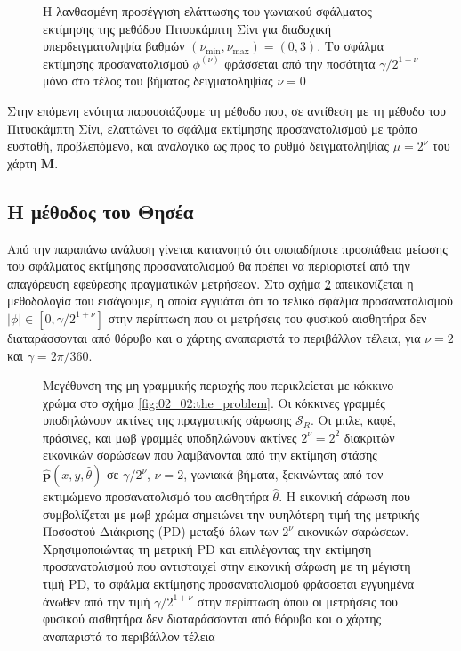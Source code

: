 \begin{figure}[!h]\centering
  
  \caption{\small Η λανθασμένη προσέγγιση ελάττωσης του γωνιακού σφάλματος
           εκτίμησης της μεθόδου Πιτυοκάμπτη Σίνι για διαδοχική
           υπερδειγματοληψία βαθμών $(\nu_{\min}, \nu_{\max}) = (0,3)$. Το
           σφάλμα εκτίμησης προσανατολισμού $\phi^{(\nu)}$ φράσσεται από την
           ποσότητα $\gamma/2^{1+\nu}$ μόνο στο τέλος του βήματος
           δειγματοληψίας $\nu=0$}
  \label{fig:02_04_02:sinis}
\end{figure}

Στην επόμενη ενότητα παρουσιάζουμε τη μέθοδο που, σε αντίθεση με τη μέθοδο του
Πιτυοκάμπτη Σίνι, ελαττώνει το σφάλμα εκτίμησης προσανατολισμού με τρόπο
ευσταθή, προβλεπόμενο, και αναλογικό ως προς το ρυθμό δειγματοληψίας $\mu =
2^{\nu}$ του χάρτη $\bm{M}$.

\subsection{Η μέθοδος του Θησέα}
\label{subsection:02_04_02:06}

Από την παραπάνω ανάλυση γίνεται κατανοητό ότι οποιαδήποτε προσπάθεια
μείωσης του σφάλματος εκτίμησης προσανατολισμού θα πρέπει να περιοριστεί από
την απαγόρευση εφεύρεσης πραγματικών μετρήσεων. Στο σχήμα
\ref{fig:oversampling_correct} απεικονίζεται η μεθοδολογία που εισάγουμε, η
οποία εγγυάται ότι το τελικό σφάλμα προσανατολισμού $|\phi| \in [0,\gamma /
2^{1+\nu}]$ στην περίπτωση που οι μετρήσεις του φυσικού αισθητήρα δεν
διαταράσσονται από θόρυβο και ο χάρτης αναπαριστά το περιβάλλον τέλεια, για
$\nu = 2$ και $\gamma = 2\pi/360$.

\begin{figure}[!h]\centering
  
  \caption{\small Μεγέθυνση της μη γραμμικής περιοχής που περικλείεται με
           κόκκινο χρώμα στο σχήμα \ref{fig:02_02:the_problem}. Οι κόκκινες
           γραμμές υποδηλώνουν ακτίνες της πραγματικής σάρωσης $\mathcal{S}_R$.
           Οι μπλε, καφέ, πράσινες, και μωβ γραμμές υποδηλώνουν
           ακτίνες $2^\nu = 2^2$ διακριτών εικονικών σαρώσεων που λαμβάνονται
           από την εκτίμηση στάσης $\hat{\bm{p}}(x,y,\hat{\theta})$ σε
           $\gamma/2^\nu$, $\nu = 2$, γωνιακά βήματα, ξεκινώντας από τον
           εκτιμώμενο προσανατολισμό του αισθητήρα $\hat{\theta}$. Η εικονική
           σάρωση που συμβολίζεται με μωβ χρώμα σημειώνει την υψηλότερη τιμή
           της μετρικής Ποσοστού Διάκρισης (PD) μεταξύ όλων των $2^\nu$
           εικονικών σαρώσεων. Χρησιμοποιώντας τη μετρική PD και επιλέγοντας
           την εκτίμηση προσανατολισμού που αντιστοιχεί στην εικονική σάρωση με
           τη μέγιστη τιμή PD, το σφάλμα εκτίμησης προσανατολισμού φράσσεται
           εγγυημένα άνωθεν από την τιμή $\gamma/2^{1+\nu}$ στην περίπτωση
           όπου οι μετρήσεις του φυσικού αισθητήρα δεν διαταράσσονται από
           θόρυβο και ο χάρτης αναπαριστά το περιβάλλον τέλεια}
  \label{fig:oversampling_correct}
\end{figure}

